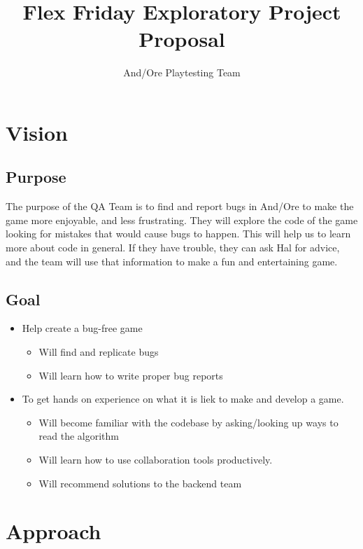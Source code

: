 \documentclass[11pt]{article}
\title{\textbf{{\color{blue}Flex Friday Exploratory Project Proposal}}}
\author{And/Ore Playtesting Team}
\date{}
\begin{document}
\maketitle

\section{{\color{blue}Vision}}

\subsection{{\color{blue}Purpose}}

The purpose of the QA Team is to find and report bugs in And/Ore to make the game more enjoyable, and less frustrating. They will explore the code of the game looking for mistakes that would cause bugs to happen. This will help us to learn more about code in general. If they have trouble, they can ask Hal for advice, and the team will use that information to make a fun and entertaining game.



\subsection{{\color{blue}Goal}}

\begin{itemize}
	\item Help create a bug-free game
		\begin{itemize}
			\item Will find and replicate bugs
			\item Will learn how to write proper bug reports
		\end{itemize}
	\item To get hands on experience on what it is liek to make and develop a game.
		\begin{itemize}
			\item Will become familiar with the codebase by asking/looking up ways to read the algorithm
			\item Will learn how to use collaboration tools productively.
			\item Will recommend solutions to the backend team
		\end{itemize}
\end{itemize}

\section{{\color{blue}Approach}}
\end{document}
